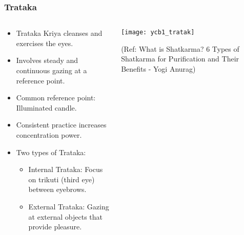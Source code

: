 \begin{frame}[fragile]\frametitle{Trataka}
\begin{columns}
    \begin{column}[T]{0.5\linewidth}
     \begin{itemize}
          \item Trataka Kriya cleanses and exercises the eyes.
          \item Involves steady and continuous gazing at a reference point.
          \item Common reference point: Illuminated candle.
          \item Consistent practice increases concentration power.
          \item Two types of Trataka:
            \begin{itemize}
              \item Internal Trataka: Focus on trikuti (third eye) between eyebrows.
              \item External Trataka: Gazing at external objects that provide pleasure.
            \end{itemize}
      \end{itemize}
    \end{column}
    \begin{column}[T]{0.5\linewidth}
        \begin{center}
        \texttt{[image: ycb1\_tratak]}
		
		{\tiny (Ref: What is Shatkarma? 6 Types of Shatkarma for Purification and Their Benefits - Yogi Anurag)}	
        \end{center}	
    \end{column}
\end{columns}	  
\end{frame}

